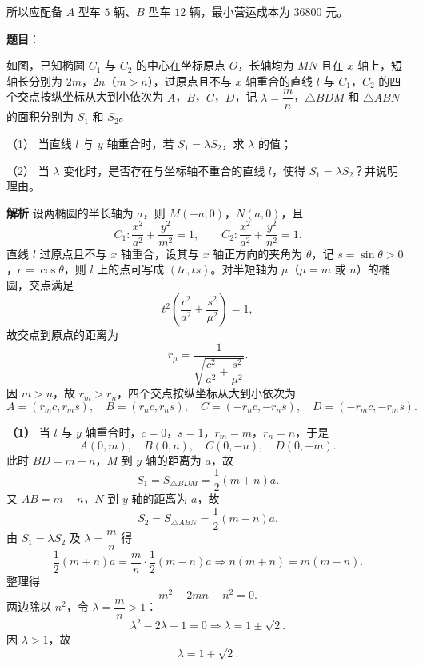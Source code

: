 \begin{answer}
所以应配备 $A$ 型车 $5$ 辆、$B$ 型车 $12$ 辆，最小营运成本为 $36800$ 元。



\end{answer}
\begin{answer}

\textbf{题目}：

如图，已知椭圆 $C_1$ 与 $C_2$ 的中心在坐标原点 $O$，长轴均为 $MN$ 且在 $x$ 轴上，短轴长分别为 $2m$，$2n$（$m>n$），过原点且不与 $x$ 轴重合的直线 $l$ 与 $C_1$，$C_2$ 的四个交点按纵坐标从大到小依次为 $A$，$B$，$C$，$D$，记 $\lambda=\dfrac mn$，$\triangle BDM$ 和 $\triangle ABN$ 的面积分别为 $S_1$ 和 $S_2$。

（1） 当直线 $l$ 与 $y$ 轴重合时，若 $S_1=\lambda S_2$，求 $\lambda$ 的值；

（2） 当 $\lambda$ 变化时，是否存在与坐标轴不重合的直线 $l$，使得 $S_1=\lambda S_2$？并说明理由。
\nopagebreak[4]
\begin{center}\end{center}
\nopagebreak[4]
\textbf{解析}
设两椭圆的半长轴为 $a$，则 $M(-a,0)$，$N(a,0)$，且
\nopagebreak[4]
\[C_1:\frac{x^2}{a^2}+\frac{y^2}{m^2}=1,\qquad
C_2:\frac{x^2}{a^2}+\frac{y^2}{n^2}=1.\]
直线 $l$ 过原点且不与 $x$ 轴重合，设其与 $x$ 轴正方向的夹角为 $\theta$，记 $s=\sin\theta>0$，$c=\cos\theta$，则 $l$ 上的点可写成 $(tc,ts)$。对半短轴为 $\mu$（$\mu=m$ 或 $n$）的椭圆，交点满足
\nopagebreak[4]
\[t^2\left(\frac{c^2}{a^2}+\frac{s^2}{\mu^2}\right)=1,\]
故交点到原点的距离为
\nopagebreak[4]
\[r_\mu=\frac1{\sqrt{\dfrac{c^2}{a^2}+\dfrac{s^2}{\mu^2}}}.\]
因 $m>n$，故 $r_m>r_n$，四个交点按纵坐标从大到小依次为
\nopagebreak[4]
\[A=(r_mc,r_ms),\quad B=(r_nc,r_ns),\quad C=(-r_nc,-r_ns),\quad D=(-r_mc,-r_ms).\]

\textbf{（1）} 当 $l$ 与 $y$ 轴重合时，$c=0$，$s=1$，$r_m=m$，$r_n=n$，于是
\nopagebreak[4]
\[A(0,m),\quad B(0,n),\quad C(0,-n),\quad D(0,-m).\]
此时 $BD=m+n$，$M$ 到 $y$ 轴的距离为 $a$，故
\nopagebreak[4]
\[S_1=S_{\triangle BDM}=\frac12(m+n)a.\]
又 $AB=m-n$，$N$ 到 $y$ 轴的距离为 $a$，故
\nopagebreak[4]
\[S_2=S_{\triangle ABN}=\frac12(m-n)a.\]
由 $S_1=\lambda S_2$ 及 $\lambda=\dfrac mn$ 得
\nopagebreak[4]
\[\frac12(m+n)a=\frac mn\cdot\frac12(m-n)a
\Longrightarrow n(m+n)=m(m-n).\]
整理得
\nopagebreak[4]
\[m^2-2mn-n^2=0.\]
两边除以 $n^2$，令 $\lambda=\dfrac mn>1$：
\nopagebreak[4]
\[\lambda^2-2\lambda-1=0\Longrightarrow\lambda=1\pm\sqrt2.\]
因 $\lambda>1$，故
\nopagebreak[4]
\[\lambda=1+\sqrt2.\]


\end{answer}
